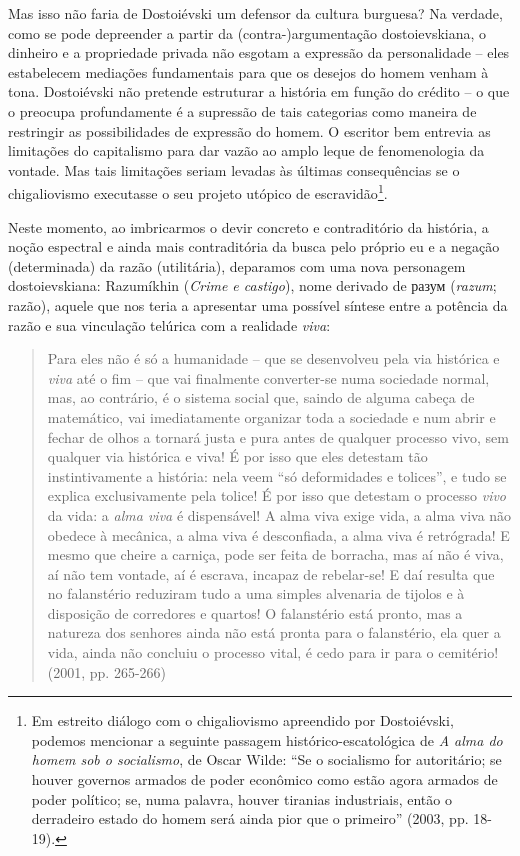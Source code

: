 Mas isso não faria de Dostoiévski um defensor da cultura burguesa? Na
verdade, como se pode depreender a partir da (contra-)argumentação
dostoievskiana, o dinheiro e a propriedade privada não esgotam a
expressão da personalidade -- eles estabelecem mediações fundamentais
para que os desejos do homem venham à tona. Dostoiévski não pretende
estruturar a história em função do crédito -- o que o preocupa
profundamente é a supressão de tais categorias como maneira de
restringir as possibilidades de expressão do homem. O escritor bem
entrevia as limitações do capitalismo para dar vazão ao amplo leque de
fenomenologia da vontade. Mas tais limitações seriam levadas às últimas
consequências se o chigaliovismo executasse o seu projeto utópico de
escravidão\footnote{Em estreito diálogo com o chigaliovismo apreendido
  por Dostoiévski, podemos mencionar a seguinte passagem
  histórico-escatológica de \emph{A alma do homem sob o socialismo}, de
  Oscar Wilde: ``Se o socialismo for autoritário; se houver governos
  armados de poder econômico como estão agora armados de poder político;
  se, numa palavra, houver tiranias industriais, então o derradeiro
  estado do homem será ainda pior que o primeiro'' (2003, pp. 18-19).}.

Neste momento, ao imbricarmos o devir concreto e contraditório da
história, a noção espectral e ainda mais contraditória da busca pelo
próprio eu e a negação (determinada) da razão (utilitária), deparamos
com uma nova personagem dostoievskiana: Razumíkhin (\emph{Crime e
castigo}), nome derivado de
разум (\emph{razum};
razão), aquele que nos teria a apresentar uma possível síntese entre a
potência da razão e sua vinculação telúrica com a realidade \emph{viva}:

\begin{quote}
Para eles não é só a humanidade -- que se desenvolveu pela via histórica
e \emph{viva} até o fim -- que vai finalmente converter-se numa
sociedade normal, mas, ao contrário, é o sistema social que, saindo de
alguma cabeça de matemático, vai imediatamente organizar toda a
sociedade e num abrir e fechar de olhos a tornará justa e pura antes de
qualquer processo vivo, sem qualquer via histórica e viva! É por isso
que eles detestam tão instintivamente a história: nela veem ``só
deformidades e tolices'', e tudo se explica exclusivamente pela tolice!
É por isso que detestam o processo \emph{vivo} da vida: a \emph{alma
viva} é dispensável! A alma viva exige vida, a alma viva não obedece à
mecânica, a alma viva é desconfiada, a alma viva é retrógrada! E mesmo
que cheire a carniça, pode ser feita de borracha, mas aí não é viva, aí
não tem vontade, aí é escrava, incapaz de rebelar-se! E daí resulta que
no falanstério reduziram tudo a uma simples alvenaria de tijolos e à
disposição de corredores e quartos! O falanstério está pronto, mas a
natureza dos senhores ainda não está pronta para o falanstério, ela quer
a vida, ainda não concluiu o processo vital, é cedo para ir para o
cemitério! (2001, pp. 265-266)
\end{quote}

